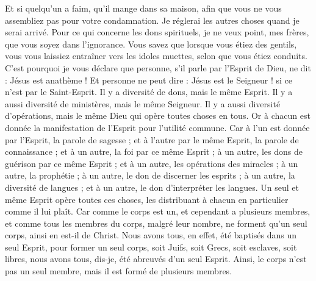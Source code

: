 \begin{multicols}{2}
Et si quelqu'un a faim, qu'il mange dans sa maison, afin que vous ne vous assembliez pas pour votre condamnation. Je réglerai les autres choses quand je serai arrivé.
\VerseOne{}Pour ce qui concerne les dons spirituels, je ne veux point, mes frères, que vous soyez dans l’ignorance.
Vous savez que lorsque vous étiez des gentils, vous vous laissiez entraîner vers les idoles muettes, selon que vous étiez conduits.
C'est pourquoi je vous déclare que personne, s’il parle par l'Esprit de Dieu, ne dit : Jésus est anathème ! Et personne ne peut dire : Jésus est le Seigneur ! si ce n’est par le Saint-Esprit.
Il y a diversité de dons, mais le même Esprit.
Il y a aussi diversité de ministères, mais le même Seigneur.
Il y a aussi diversité d'opérations, mais le même Dieu qui opère toutes choses en tous.
Or à chacun est donnée la manifestation de l'Esprit pour l'utilité commune.
Car à l'un est donnée par l'Esprit, la parole de sagesse ; et à l'autre par le même Esprit, la parole de connaissance ;
et à un autre, la foi par ce même Esprit ; à un autre, les dons de guérison par ce même Esprit ;
et à un autre, les opérations des miracles ; à un autre, la prophétie ; à un autre, le don de discerner les esprits ; à un autre, la diversité de langues ; et à un autre, le don d'interpréter les langues.
Un seul et même Esprit opère toutes ces choses, les distribuant à chacun en particulier comme il lui plaît.
Car comme le corps est un, et cependant a plusieurs membres, et comme tous les membres du corps, malgré leur nombre, ne forment qu’un seul corps, ainsi en est-il de Christ.
Nous avons tous, en effet, été baptisés dans un seul Esprit, pour former un seul corps, soit Juifs, soit Grecs, soit esclaves, soit libres, nous avons tous, dis-je, été abreuvés d'un seul Esprit.
Ainsi, le corps n’est pas un seul membre, mais il est formé de plusieurs membres.

\end{multicols}
